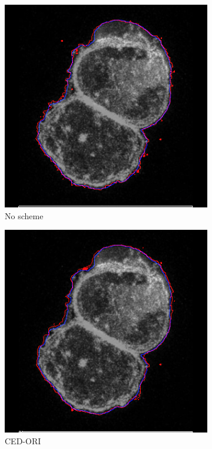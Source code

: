 \documentclass[a4paper,11pt]{ijamas}
\begin{document}
{\begin{figure}
\centering
\begin{subfigure}{.25\textwidth}
  \centering
  \includegraphics[width=0.80\columnwidth]{./figs/results/2no.jpg}
 \caption{No scheme}
  \label{fig:noseg_2}
\end{subfigure}%
\begin{subfigure}{.25\textwidth}
  \centering
  \includegraphics[width=0.80\columnwidth]{./figs/results/2ced.jpg}
 \caption{CED-ORI}
  \label{fig:cedseg_2}
\end{subfigure}%
\begin{subfigure}{.25\textwidth}

\end{subfigure}
\end{figure}}
\end{document}
